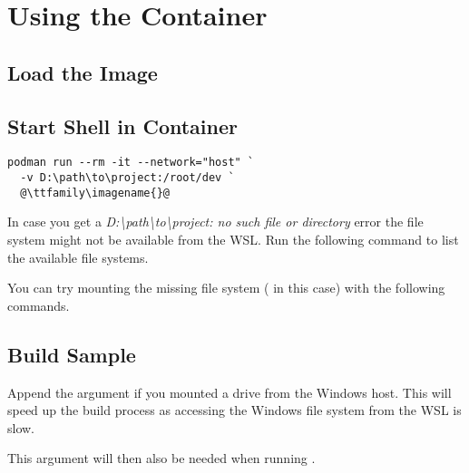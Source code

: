\newpage

\section{Using the Container}

\subsection{Load the Image}

 {\ttfamily\imagename{}}

\subsection{Start Shell in Container}

\begin{lstlisting}
podman run --rm -it --network="host" `
  -v D:\path\to\project:/root/dev `
  @\ttfamily\imagename{}@
\end{lstlisting}

\begin{infobox}
  In case you get a
  \emph{D:\textbackslash{}path\textbackslash{}to\textbackslash{}project: no such
    file or directory} error the file system might not be available from the WSL.
  Run the following command to list the available file systems.


  You can try mounting the missing file system ( in this case) with
  the following commands.


\end{infobox}

\subsection{Build Sample}



\begin{infobox}
  Append the  argument if you mounted a drive from
  the Windows host. This will speed up the build process as accessing the
  Windows file system from the WSL is slow.


  This argument will then also be needed when running .
\end{infobox}

